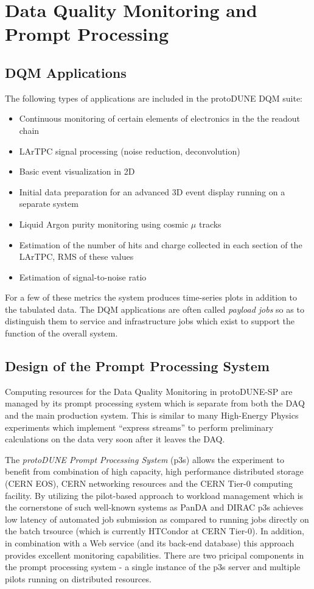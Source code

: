 \documentclass{webofc}
\newcommand{\pd}{protoDUNE\xspace}
\begin{document}
\section{Data Quality Monitoring and Prompt Processing}
\subsection{DQM Applications}
The following types of applications are included in the \pd DQM suite:
\begin{itemize}
\item Continuous monitoring of certain elements of electronics in the the readout chain
\item LArTPC signal processing (noise reduction, deconvolution)
\item Basic event visualization in 2D
\item Initial data preparation for an advanced 3D event display running on a separate system
\item Liquid Argon purity monitoring using cosmic $\mu$ tracks
\item Estimation of the number of hits and charge collected in each section of the LArTPC, RMS of these values
\item Estimation of signal-to-noise ratio
\end{itemize}

\noindent For a few of these metrics the system produces time-series plots in addition to the tabulated data.
The DQM applications are often called \textit{payload jobs} so as to distinguish
them to service and infrastructure jobs which exist to support the function of the overall system.


\subsection{Design of the Prompt Processing System}

Computing resources for the Data Quality Monitoring in \pd-SP are managed by its prompt processing system
which is separate from both the DAQ and the main production system. This is similar to many High-Energy Physics
experiments which implement ``express streams'' to perform preliminary calculations on the data very soon
after it leaves the DAQ.

The \textit{\pd Prompt Processing System} (p3s) allows the experiment to benefit from combination of high capacity, high
performance distributed storage (CERN EOS), CERN networking resources and the CERN Tier-0 computing facility.
By utilizing the pilot-based approach to workload management which is the cornerstone of such well-known
systems as PanDA and DIRAC \cite{panda,dirac} p3s achieves low latency of automated job submission
as compared to running jobs directly on the batch trsource (which is currently HTCondor at CERN Tier-0).
In addition, in combination with a Web service (and its back-end database) this approach provides excellent
monitoring capabilities. There are two pricipal components in the prompt processing system - a single instance
of the p3s server and multiple pilots running on distributed resources.
\end{document}
